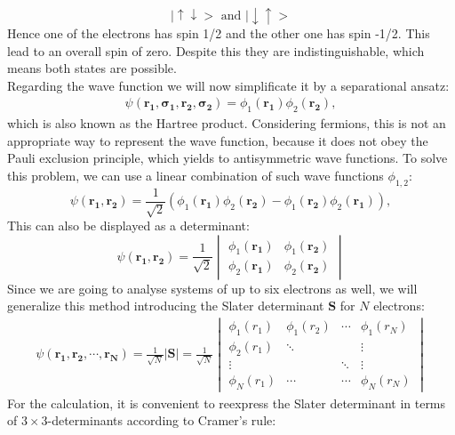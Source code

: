 \begin{equation}
|\uparrow \downarrow > \text{~and~} |\downarrow \uparrow >
\end{equation}
Hence one of the electrons has spin 1/2 and the other one has spin -1/2. This lead to an overall spin of zero. Despite this they are indistinguishable, which means both states are possible.\\
Regarding the wave function we will now simplificate it by a separational ansatz:
\begin{align}
\psi (\mathbf{r_1,\sigma_1,r_2, \sigma_2}) = \phi_1(\mathbf{r_1}) \phi_2(\mathbf{r_2}), 
\end{align}
which is also known as the Hartree product. Considering fermions, this is not an appropriate way to represent the wave function, because it does not obey the Pauli exclusion principle, which yields to antisymmetric wave functions. To solve this problem, we can use a linear combination of such wave functions $\phi_{1,2}$:
\begin{equation}
\psi (\mathbf{r_1,r_2}) = \frac{1}{\sqrt{2}}\left(\phi_1(\mathbf{r_1}) \phi_2(\mathbf{r_2})-\phi_1(\mathbf{r_2}) \phi_2(\mathbf{r_1})\right), 
\end{equation}
This can also be displayed as a determinant:
\begin{equation}
\psi (\mathbf{r_1,r_2}) = \frac{1}{\sqrt{2}} 
\begin{vmatrix}
\phi_1(\mathbf{r_1}) &\phi_1(\mathbf{r_2})\\
\phi_2(\mathbf{r_1}) & \phi_2(\mathbf{r_2})
\end{vmatrix}
\end{equation}
Since we are going to analyse systems of up to six electrons as well, we will generalize this method introducing the Slater determinant $\mathbf{S}$ for $N$ electrons:
\begin{align}
\psi (\mathbf{r_1,r_2,\cdots,r_N}) = \frac{1}{\sqrt{N}} |\mathbf{S}| = \frac{1}{\sqrt{N}}
\begin{vmatrix}
\phi_1(r_1) & \phi_1(r_2) & \cdots & \phi_1(r_N)\\
\phi_2(r_1) & \ddots & &\vdots \\
\vdots & & \ddots& \vdots\\
\phi_N(r_1) & \cdots & \cdots & \phi_N(r_N)
\end{vmatrix}
\end{align}
For the calculation, it is convenient to reexpress the Slater determinant in terms of $3\times 3$-determinants according to Cramer's rule:
